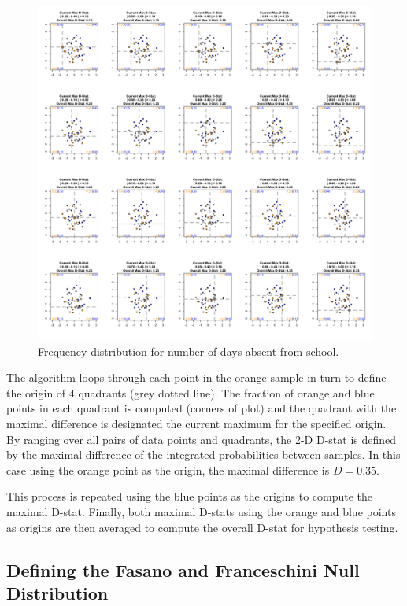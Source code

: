 \documentclass[codesnippet]{jss}
\begin{document}
\begin{figure}[t!]
\centering
\includegraphics{fftestOutput}
\caption{\label{fig:kstest2D} Frequency distribution for number of days absent
from school.}
\end{figure}

The algorithm loops through each point in the orange sample in turn to define the origin of 4 quadrants (grey dotted line). The fraction of orange and blue points in each quadrant is computed (corners of plot) and the quadrant with the maximal difference is designated the current maximum for the specified origin. By ranging over all pairs of data points and quadrants, the 2-D D-stat is defined by the maximal difference of the integrated probabilities between samples. In this case using the orange point as the origin, the maximal difference is $D = 0.35$.

This process is repeated using the blue points as the origins to compute the maximal D-stat. Finally, both maximal D-stats using the orange and blue points as origins are then averaged to compute the overall D-stat for hypothesis testing.

\subsection{Defining the Fasano and Franceschini Null Distribution}
\end{document}
